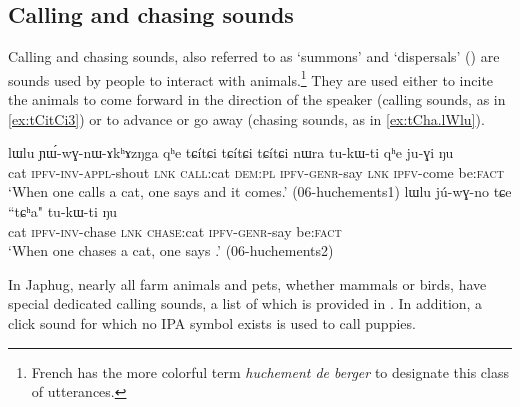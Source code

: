 \subsection{Calling  and chasing sounds} \label{sec:call}
Calling and chasing sounds, also referred to as `summons' and `dispersals' (\citealt[318--319]{aikhenvald10imperative}) are sounds used by people to interact with animals.\footnote{French has the more colorful term \textit{huchement de berger} to designate this class of utterances.} They are used either to incite the animals to come forward in the direction of the speaker (calling sounds, as in \ref{ex:tCitCi3}) or to advance or go away (chasing sounds, as in \ref{ex:tCha.lWlu}). 

\begin{exe}
\ex 
\begin{xlist}
\ex \label{ex:tCitCi3}
\gll lɯlu ɲɯ́-wɣ-nɯ-ɤkʰɤzŋga qʰe {tɕítɕi tɕítɕi tɕítɕi} nɯra tu-kɯ-ti qʰe ju-ɣi ŋu \\
cat \textsc{ipfv}-\textsc{inv}-\textsc{appl}-shout \textsc{lnk} \textsc{call}:cat \textsc{dem}:\textsc{pl} \textsc{ipfv}-\textsc{genr}-say \textsc{lnk} \textsc{ipfv}-come be:\textsc{fact} \\
\glt `When one calls a cat, one says  and it comes.' (06-huchements1)
\ex \label{ex:tCha.lWlu}
\gll lɯlu jú-wɣ-no tɕe ``tɕʰa" tu-kɯ-ti ŋu \\
cat \textsc{ipfv}-\textsc{inv}-chase \textsc{lnk} \textsc{chase}:cat \textsc{ipfv}-\textsc{genr}-say be:\textsc{fact} \\
\glt `When one chases a cat, one says .' (06-huchements2)
\end{xlist}
\end{exe}

In Japhug, nearly all farm animals and pets, whether mammals or birds, have special dedicated calling sounds, a list of which is provided in . In addition, a click sound for which no IPA symbol exists is used to call puppies.

